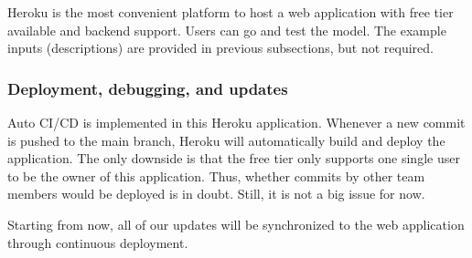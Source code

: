 \documentclass[
	a4paper,
	fontsize=10pt, %
	twoside=false, %
	secnumdepth=2, %
]{kaohandt}
\begin{document}
Heroku is the most convenient platform to host a web application with free tier available and backend support. Users can go and test the model. The example inputs (descriptions) are provided in previous subsections, but not required.

\subsubsection{Deployment, debugging, and updates}

Auto CI/CD is implemented in this Heroku application. Whenever a new commit is pushed to the main branch, Heroku will automatically build and deploy the application. The only downside is that the free tier only supports one single user to be the owner of this application. Thus, whether commits by other team members would be deployed is in doubt.  Still, it is not a big issue for now.

Starting from now, all of our updates will be synchronized to the web application through continuous deployment.








\end{document}

